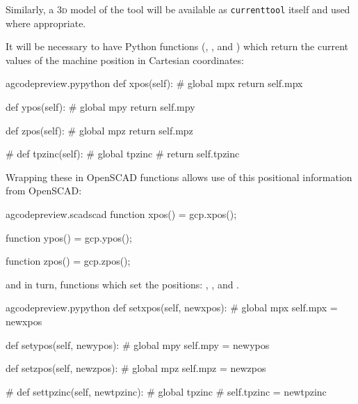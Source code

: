 \documentclass{ltxdoc}
\begin{document}
Similarly, a \textsc{3d} model of the tool will be available as \verb|currenttool| itself and used where appropriate.

It will be necessary to have Python functions (, , and ) which return the current values of the machine position in Cartesian coordinates: 

\lstset{firstnumber=\thegcpy}
\begin{writecode}{a}{gcodepreview.py}{python}
    def xpos(self):
#        global mpx
        return self.mpx

    def ypos(self):
#        global mpy
        return self.mpy

    def zpos(self):
#        global mpz
        return self.mpz

#    def tpzinc(self):
#        global tpzinc
#        return self.tpzinc

\end{writecode}
\addtocounter{gcpy}{16}

Wrapping these in OpenSCAD functions allows use of this positional information from OpenSCAD:

\lstset{firstnumber=\thegcpscad}
\begin{writecode}{a}{gcodepreview.scad}{scad}
function xpos() = gcp.xpos();

function ypos() = gcp.ypos();

function zpos() = gcp.zpos();

\end{writecode}
\addtocounter{gcpscad}{7}

\noindent and in turn, functions which set the positions: 
, 
, and
.%

\lstset{firstnumber=\thegcpy}
\begin{writecode}{a}{gcodepreview.py}{python}
    def setxpos(self, newxpos):
#        global mpx
        self.mpx = newxpos

    def setypos(self, newypos):
#        global mpy
        self.mpy = newypos

    def setzpos(self, newzpos):
#        global mpz
        self.mpz = newzpos
     
#    def settpzinc(self, newtpzinc):
#        global tpzinc
#        self.tpzinc = newtpzinc

\end{writecode}
\addtocounter{gcpy}{16}
 
\end{document}
